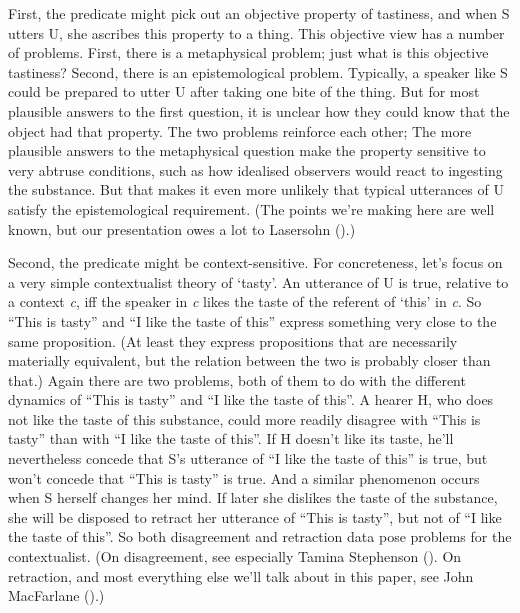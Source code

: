 \documentclass[
  11pt,
  letterpaper,
  DIV=11,
  numbers=noendperiod,
  twoside]{scrartcl}
\begin{document}
First, the predicate might pick out an objective property of tastiness,
and when S utters U, she ascribes this property to a thing. This
objective view has a number of problems. First, there is a metaphysical
problem; just what is this objective tastiness? Second, there is an
epistemological problem. Typically, a speaker like S could be prepared
to utter U after taking one bite of the thing. But for most plausible
answers to the first question, it is unclear how they could know that
the object had that property. The two problems reinforce each other; The
more plausible answers to the metaphysical question make the property
sensitive to very abtruse conditions, such as how idealised observers
would react to ingesting the substance. But that makes it even more
unlikely that typical utterances of U satisfy the epistemological
requirement. (The points we're making here are well known, but our
presentation owes a lot to Lasersohn
().)

Second, the predicate might be context-sensitive. For concreteness,
let's focus on a very simple contextualist theory of `tasty'. An
utterance of U is true, relative to a context \emph{c}, iff the speaker
in \emph{c} likes the taste of the referent of `this' in \emph{c}. So
``This is tasty'' and ``I like the taste of this'' express something
very close to the same proposition. (At least they express propositions
that are necessarily materially equivalent, but the relation between the
two is probably closer than that.) Again there are two problems, both of
them to do with the different dynamics of ``This is tasty'' and ``I like
the taste of this''. A hearer H, who does not like the taste of this
substance, could more readily disagree with ``This is tasty'' than with
``I like the taste of this''. If H doesn't like its taste, he'll
nevertheless concede that S's utterance of ``I like the taste of this''
is true, but won't concede that ``This is tasty'' is true. And a similar
phenomenon occurs when S herself changes her mind. If later she dislikes
the taste of the substance, she will be disposed to retract her
utterance of ``This is tasty'', but not of ``I like the taste of this''.
So both disagreement and retraction data pose problems for the
contextualist. (On disagreement, see especially Tamina Stephenson
(). On retraction, and most
everything else we'll talk about in this paper, see John MacFarlane
().)
\end{document}
